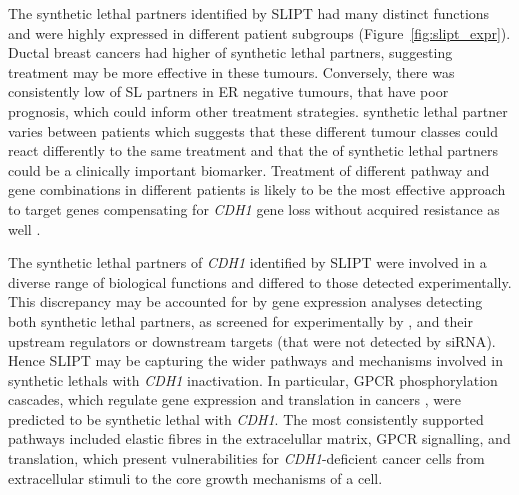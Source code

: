The \gls{synthetic lethal} partners identified by \gls{SLIPT} had many distinct functions and were highly expressed in different patient subgroups (Figure~\ref{fig:slipt_expr}). %
Ductal breast cancers had higher  of \gls{synthetic lethal} partners, suggesting treatment may be more effective in these tumours.  Conversely, there was consistently low  of SL partners in \gls{ER} negative tumours, that have poor prognosis, which could inform other treatment strategies. %
\Gls{synthetic lethal} partner  varies between patients which suggests that these different tumour classes could react differently to the same treatment and that the  of synthetic lethal partners could be a clinically important biomarker. Treatment of different \gls{pathway} and gene combinations in different patients is likely to be the most effective approach to target genes compensating for \textit{CDH1} gene loss without acquired resistance as well \citep{Lord2014}. 

The \gls{synthetic lethal} partners of \textit{CDH1} identified by \gls{SLIPT} were involved in a diverse range of biological functions and differed to those detected experimentally. This discrepancy may be accounted for by \gls{gene expression} analyses detecting both \gls{synthetic lethal} partners, as screened for experimentally by \citet{Telford2015}, and their upstream regulators or downstream targets (that were not detected by \gls{siRNA}). Hence \gls{SLIPT} may be capturing the wider \glspl{pathway} and mechanisms involved in \glspl{synthetic lethal} with \textit{CDH1} inactivation. In particular, \gls{GPCR} phosphorylation cascades, which regulate \gls{gene expression} and translation in cancers \citep{Gao2015}, were predicted to be \gls{synthetic lethal} with \textit{CDH1}. 
The most consistently supported \glspl{pathway} included elastic fibres in the extracelullar matrix, \gls{GPCR} signalling, and translation, which present vulnerabilities for \textit{CDH1}-deficient cancer cells from extracellular stimuli to the core growth mechanisms of a cell.

